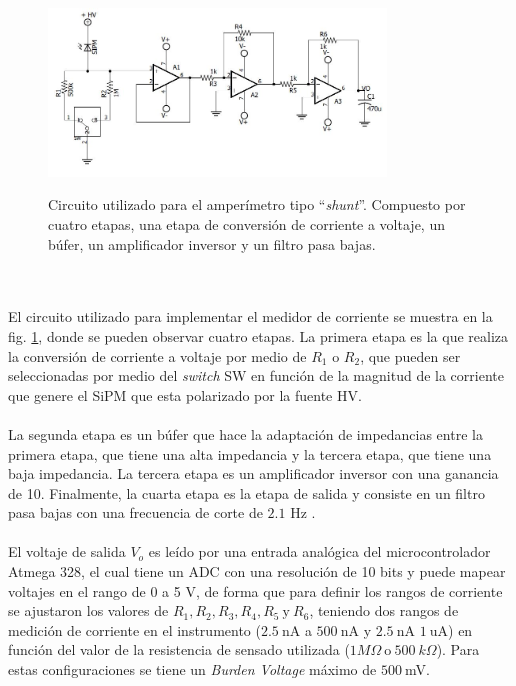 \begin{figure}[h!]
\begin{centering}
    \caption{Circuito utilizado para el amperímetro tipo ``\textit{shunt}''. Compuesto por cuatro etapas, una etapa de conversión de corriente a voltaje, un búfer, un amplificador inversor y un filtro pasa bajas.  }
   \includegraphics[width=0.8\textwidth]{Images/ammeter.JPG}
    \label{fig:ammeter}
  \par\end{centering}
\end{figure}
\\ \\
El circuito utilizado para implementar el medidor de corriente se muestra en la fig. \ref{fig:ammeter}, donde se pueden observar cuatro etapas. La primera etapa es la que realiza la conversión de corriente a voltaje por medio de $R_1$ o $R_2$, que pueden ser seleccionadas por medio del \textit{switch} SW en función de la magnitud de la corriente que genere el SiPM que esta polarizado por la fuente HV. \\ \\
La segunda etapa es un búfer que hace la adaptación de impedancias entre la primera etapa, que tiene una alta impedancia y la tercera etapa, que tiene una baja impedancia. La tercera etapa es un amplificador inversor con una ganancia de 10. Finalmente, la cuarta etapa es la etapa de salida y consiste en un filtro pasa bajas con una frecuencia de corte de $2.1$ Hz .\\ \\
El voltaje de salida $V_o$ es leído por una entrada analógica del microcontrolador Atmega 328, el cual tiene un ADC con una resolución de 10 bits y  puede mapear voltajes en el rango de 0 a 5 V, de forma que para definir los rangos de corriente se ajustaron los valores de $R_1, R_2, R_3, R_4, R_5~\mbox{y}~R_6$, teniendo dos rangos de medición de corriente en el instrumento ($2.5~\mbox{nA}$ a $500~\mbox{nA}$ y $2.5~\mbox{nA}$ $1~\mbox{uA}$) en función del valor de la resistencia de sensado utilizada ($1M\Omega~\mbox{o}~500~k\Omega$). Para estas configuraciones se tiene un \textit{Burden Voltage} máximo de $500~$mV.\\ \\
